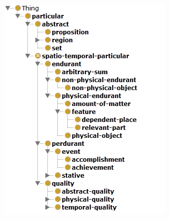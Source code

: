 \begin{figure}[ht]
\begin{minipage}[b]{0.45\linewidth}
\centering
\includegraphics[width=\textwidth]{media/chapter3/dolce-taxonomy}
\end{minipage}
\hspace{0.5cm}
\begin{minipage}[b]{0.45\linewidth}
\centering

\end{minipage}
\end{figure}
